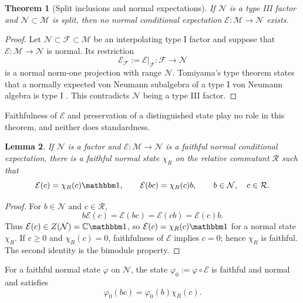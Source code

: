 \documentclass[a4paper,11pt]{article}
\newtheorem{theorem}{Theorem}
\newtheorem{lemma}[theorem]{Lemma}
\theoremstyle{definition}
\newcommand{\mE}{\mathcal{E}}
\begin{document}
\begin{theorem}[Split inclusions and normal expectations]\label{thm:split-no-expectation}
If $\mathcal N$ is a type III factor and
$\mathcal N\subset\mathcal M$ is split, then no normal conditional expectation
$\mE:\mathcal M\to\mathcal N$ exists.
\end{theorem}

\begin{proof}
Let $\mathcal N\subset\mathcal F\subset\mathcal M$ be an interpolating type I
factor and suppose that $\mE:\mathcal M\to \mathcal N$ is normal.  Its restriction
\begin{equation}
 \mE_{\mathcal F}:=\mE|_{\mathcal F}:\mathcal F\longrightarrow\mathcal N
\end{equation}
is a normal norm-one projection with range $\mathcal N$.  Tomiyama's type
theorem states that a normally expected von Neumann subalgebra of a type I von
Neumann algebra is type I \cite{Tomiyama1959}\cite{Takesaki1972}. This contradicts $\mathcal N$ being a type III factor.
\end{proof}

Faithfulness of $\mE$ and preservation of a distinguished state play no role in this theorem, and neither does standardness.

\begin{lemma}\label{lem:expectation-slice}
If $\mathcal N$ is a factor and $\mE:\mathcal M\to\mathcal N$ is a faithful
normal conditional expectation, there is a faithful normal state $\chi_R$ on
the relative commutant $\mathcal R$ such that
\begin{equation}
 \mE(c)=\chi_R(c)\mathbbm 1,
 \qquad \mE(b c)=\chi_R(c)b,
 \qquad b\in\mathcal N,\quad c\in\mathcal R.
\end{equation}
\end{lemma}

\begin{proof}
For $b\in\mathcal N$ and $c\in\mathcal R$,
\begin{equation}
 b \mE(c)=\mE(b c)=\mE(c b)=\mE(c)b.
\end{equation}
Thus $\mE(c)\in Z(\mathcal N)=\mathbb C\mathbbm 1$, so
$\mE(c)=\chi_R(c)\mathbbm 1$ for a normal state $\chi_R$.  If $c\geq0$ and
$\chi_R(c)=0$, faithfulness of $\mE$ implies $c=0$; hence $\chi_R$ is faithful.  The
second identity is the bimodule property.
\end{proof}

For a faithful normal state $\varphi$ on $\mathcal N$, the state
$\varphi_0:=\varphi\circ \mE$ is faithful and normal and satisfies
\begin{equation}
 \varphi_0(b c)=\varphi_0(b)\chi_R(c).
\end{equation}
\end{document}
